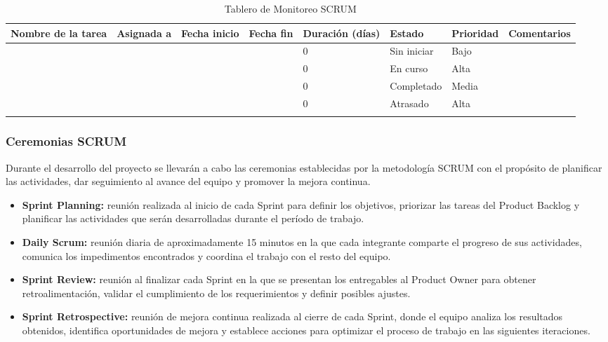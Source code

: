 \documentclass[12pt,letterpaper]{article}
\begin{document}
\begingroup
\small
\setlength{\tabcolsep}{3pt}
\begin{xltabular}{\textwidth}{|X|p{1.6cm}|p{1.5cm}|p{1.5cm}|p{1.1cm}|p{1.5cm}|p{1.3cm}|X|}
\hline
{}
\textbf{Nombre de la tarea} & \textbf{Asignada a} & \textbf{Fecha inicio} & \textbf{Fecha fin} & \textbf{Duración (días)} & \textbf{Estado} & \textbf{Prioridad} & \textbf{Comentarios} \\
\hline
\endhead
 & & & & 0 & Sin iniciar & Bajo & \\
\hline
 & & & & 0 & En curso & Alta & \\
\hline
 & & & & 0 & Completado & Media & \\
\hline
 & & & & 0 & Atrasado & Alta & \\
\hline
\caption{Tablero de Monitoreo SCRUM}
\end{xltabular}
\endgroup

\subsubsection*{Ceremonias SCRUM}

Durante el desarrollo del proyecto se llevarán a cabo las ceremonias establecidas por la
metodología SCRUM con el propósito de planificar las actividades, dar seguimiento al
avance del equipo y promover la mejora continua.

\begin{itemize}
    \item \textbf{Sprint Planning:} reunión realizada al inicio de cada Sprint para definir los objetivos, priorizar las tareas del Product Backlog y planificar las actividades que serán desarrolladas durante el período de trabajo.
    \item \textbf{Daily Scrum:} reunión diaria de aproximadamente 15 minutos en la que cada integrante comparte el progreso de sus actividades, comunica los impedimentos encontrados y coordina el trabajo con el resto del equipo.
    \item \textbf{Sprint Review:} reunión al finalizar cada Sprint en la que se presentan los entregables al Product Owner para obtener retroalimentación, validar el cumplimiento de los requerimientos y definir posibles ajustes.
    \item \textbf{Sprint Retrospective:} reunión de mejora continua realizada al cierre de cada Sprint, donde el equipo analiza los resultados obtenidos, identifica oportunidades de mejora y establece acciones para optimizar el proceso de trabajo en las siguientes iteraciones.
\end{itemize}
\end{document}
